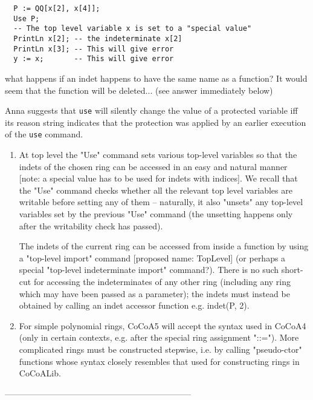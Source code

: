 \documentclass{book}[12,a4paper]
\begin{document}
\begin{lstlisting}
  P := QQ[x[2], x[4]];
  Use P;
  -- The top level variable x is set to a "special value"
  PrintLn x[2]; -- the indeterminate x[2]
  PrintLn x[3]; -- This will give error
  y := x;       -- This will give error
\end{lstlisting}

 what happens if an indet happens to have the same name as
a function?  It would seem that the function will be deleted... (see
answer immediately below)

 Anna suggests that \texttt{use} will silently change the
value of a protected variable iff its reason string indicates that the
protection was applied by an earlier execution of the \texttt{use}
command.

\begin{enumerate}
\item At top level the "Use" command sets various top-level variables
  so that the indets of the chosen ring can be accessed in an easy and
  natural manner [note: a special value has to be used for indets with
  indices].  We recall that the "Use" command checks whether all the
  relevant top level variables are writable before setting any of them
  -- naturally, it also "unsets" any top-level variables set by the
  previous "Use" command (the unsetting happens only after the
  writability check has passed).

  The indets of the current ring can be accessed from inside a
  function by using a "top-level import" command [proposed name:
  TopLevel] (or perhaps a special "top-level indeterminate import"
  command?).  There is no such short-cut for accessing the
  indeterminates of any other ring (including any ring which may have
  been passed as a parameter); the indets must instead be obtained by
  calling an indet accessor function e.g. indet(P, 2).

\item For simple polynomial rings, CoCoA5 will accept the syntax used
  in CoCoA4 (only in certain contexts, e.g. after the special ring
  assignment "::=").  More complicated rings must be constructed
  stepwise, i.e. by calling "pseudo-ctor" functions whose syntax
  closely resembles that used for constructing rings in CoCoALib.
\end{enumerate}
% 
------------------------------------------------------------------
\end{document}

